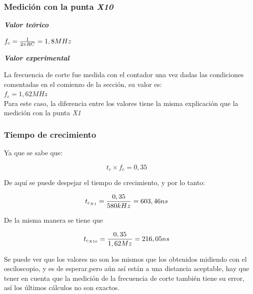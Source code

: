 \documentclass{article}
\begin{document}
\subsubsection{Medición con la punta \textit{X10}}
\medskip

\textbf{\textit{Valor teórico}}
\medskip

$f_c = {1 \over 2 \pi RC} = 1,8 MHz$

\bigskip\medskip

\textbf{\textit{Valor experimental}}
\medskip

	La frecuencia de corte fue medida con el contador una vez dadas las condiciones comentadas en el comienzo de la sección, su valor es:\\

$f_c = 1,62 MHz$ \\

Para este caso, la diferencia entre los valores tiene la misma explicación que la medición con la punta \textit{X1}
\bigskip\medskip



\subsubsection{Tiempo de crecimiento}

Ya que se sabe que:

\begin{equation}
t_c \times f_c = 0,35
\end{equation}
\smallskip

De aquí se puede despejar el tiempo de crecimiento, y por lo tanto:
\smallskip

\begin{equation}
t_{c_{X1}} = {0,35 \over 580kHz} = 603,46 ns
\end{equation}
\smallskip

De la misma manera se tiene que
\smallskip

\begin{equation}
t_{c_{X10}} = {0,35 \over 1,62Mz} = 216,05 ns
\end{equation}
\smallskip

Se puede ver que los valores no son los mismos que los obtenidos midiendo con el osciloscopio, y es de esperar,pero aún así están a una distancia aceptable, hay que tener en cuenta que la medición de la frecuencia de corte también tiene su error, así los últimos cálculos no son exactos.
\end{document}
